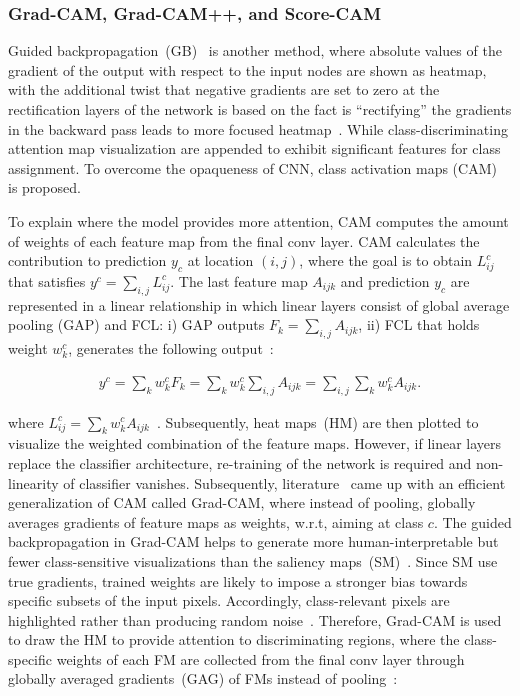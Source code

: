 \subsubsection{Grad-CAM, Grad-CAM++, and Score-CAM}
Guided backpropagation~(GB)~\cite{springenberg2014striving} is another method, where absolute values of the gradient of the output with respect to the input nodes are shown as heatmap, with the additional twist that negative gradients are set to zero at the rectification layers of the network is based on the fact is ``rectifying” the gradients in the backward pass leads to more focused heatmap~\cite{bohle2019layer}. While class-discriminating attention map visualization are appended to exhibit significant features for class assignment. To overcome the opaqueness of CNN, class activation maps (CAM)~\cite{zhou2016learning} is proposed. 

\hspace*{3.5mm} To explain where the model provides more attention, CAM computes the amount of weights of each feature map from the final conv layer. CAM calculates the contribution to prediction $y_c$ at location $(i,j)$, where the goal is to obtain $L_{ij}^{c}$ that satisfies $y^{c}=\sum_{i, j} L_{ij}^{c}$. The last feature map $A_{ijk}$ and prediction $y_c$ are represented in a linear relationship in which linear layers consist  of global average pooling (GAP) and FCL: i) GAP outputs $F_{k}=\sum_{i,j} A_{ijk}$, ii) FCL that holds weight $w_{k}^{c}$, generates the following output~\cite{kim2020extending}: 
 
 \vspace{-4mm}
 \begin{align}
     y^{c}=\sum_{k} w_{k}^{c} F_{k}=\sum_{k} w_{k}^{c} \sum_{i, j} A_{i j k}=\sum_{i, j} \sum_{k} w_{k}^{c} A_{i j k}.
 \end{align}
 \vspace{-4mm}
 
\noindent where $L_{i j}^{c}=\sum_{k} w_{k}^{c} A_{i j k}$~\cite{kim2020extending}. Subsequently, heat maps~(HM) are then plotted to visualize the weighted combination of the feature maps. However, if linear layers replace the classifier architecture, re-training of the network is required and non-linearity of classifier vanishes. Subsequently, literature~\cite{114} came up with an efficient generalization of CAM called Grad-CAM, where instead of pooling, globally averages gradients of feature maps as weights, w.r.t, aiming at class $c$. The guided backpropagation in Grad-CAM helps to generate more human-interpretable but fewer class-sensitive visualizations than the saliency maps~(SM)~\cite{nie2018theoretical}. Since SM use true gradients, trained weights are likely to impose a stronger bias towards specific subsets of the input pixels. Accordingly, class-relevant pixels are highlighted rather than producing random noise~\cite{nie2018theoretical}. Therefore, Grad-CAM is used to draw the HM to provide attention to discriminating regions, where the class-specific weights of each FM are collected from the final conv layer through globally averaged gradients~(GAG) of FMs instead of pooling~\cite{chattopadhay2018grad}: 

